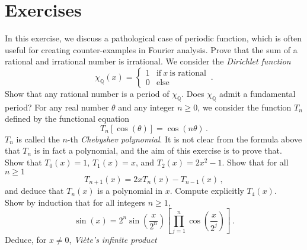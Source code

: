 \section{Exercises}
\begin{ExerciseList}
  \Exercise[label=dirichletfn] In this exercise, we discuss a pathological case of
  periodic function, which is often useful for creating counter-examples in Fourier
  analysis. \Question Prove that the sum of a rational and irrational number is
  irrational. \Question We consider the \emph{Dirichlet function}
  \begin{equation}
    \chi_{\mathbb{Q}}(x)=
    \begin{cases}
      1 & \text{if}~x~\text{is rational}\\
      0 & \text{else}
    \end{cases}\,.
  \end{equation}
  Show that any rational number is a period of $\chi_{\mathbb{Q}}$. \Question Does
  $\chi_{\mathbb{Q}}$ admit a fundamental period?
  \Exercise[label=chebyshev] For any real number $\theta$ and any integer $n\geq 0$, we
  consider the function $T_n$ defined by the functional equation
  \begin{equation}
    T_n[\cos(\theta)]=\cos(n\theta)\,.
  \end{equation}
  $T_n$ is called the $n$-th \emph{Chebyshev polynomial}. It is not clear from the formula
  above that $T_n$ is in fact a polynomial, and the aim of this exercise is to prove that.
  \Question Show that $T_0(x)=1$, $T_1(x)=x$, and $T_2(x)=2x^2-1$. \Question Show that for
  all $n\geq 1$
  \begin{equation}
    T_{n+1}(x)=2x T_n(x)-T_{n-1}(x)\,,
  \end{equation}
  and deduce that $T_n(x)$ is a polynomial in $x$. \Question Compute explicitly $T_4(x)$.
  \Exercise[label=viete]~ \Question Show by induction that for all integers $n\geq 1$,
  \begin{equation}
    \sin(x)=2^n\sin\left(\frac{x}{2^n}\right)
    \left[\prod_{j=1}^n\cos\left(\frac{x}{2^j}\right)\right]\,.
  \end{equation}
  \Question Deduce, for $x\neq 0$, \emph{Viète's infinite product}

\end{ExerciseList}
